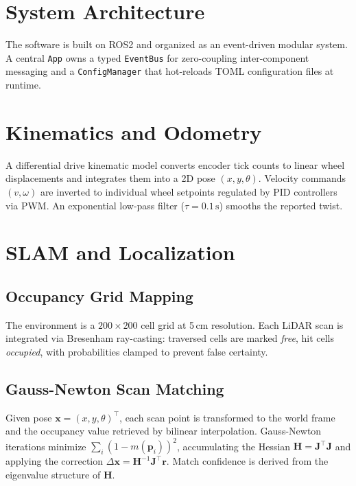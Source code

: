 \section{System Architecture}

The software is built on ROS2 and organized as an event-driven modular system. A central
\texttt{App} owns a typed \texttt{EventBus} for zero-coupling inter-component messaging
and a \texttt{ConfigManager} that hot-reloads TOML configuration files at runtime.

\section{Kinematics and Odometry}

A differential drive kinematic model converts encoder tick counts to linear wheel displacements
and integrates them into a 2D pose $(x, y, \theta)$. Velocity commands $(v, \omega)$ are
inverted to individual wheel setpoints regulated by PID controllers via PWM. An exponential
low-pass filter ($\tau{=}0.1\,\text{s}$) smooths the reported twist.

\section{SLAM and Localization}

\subsection{Occupancy Grid Mapping}

The environment is a $200{\times}200$ cell grid at 5\,cm resolution. Each LiDAR scan is
integrated via Bresenham ray-casting: traversed cells are marked \textit{free}, hit cells
\textit{occupied}, with probabilities clamped to prevent false certainty.

\subsection{Gauss-Newton Scan Matching}

Given pose $\mathbf{x}{=}(x,y,\theta)^\top$, each scan point is transformed to the world
frame and the occupancy value retrieved by bilinear interpolation. Gauss-Newton iterations
minimize $\sum_i(1{-}m(\mathbf{p}_i))^2$, accumulating the Hessian $\mathbf{H}{=}\mathbf{J}^\top\mathbf{J}$
and applying the correction $\Delta\mathbf{x}{=}\mathbf{H}^{-1}\mathbf{J}^\top\mathbf{r}$.
Match confidence is derived from the eigenvalue structure of $\mathbf{H}$.


